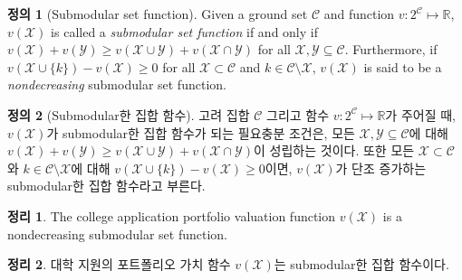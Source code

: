 \documentclass[11pt]{article} %
\newtheorem{theorem}{Theorem}
\theoremstyle{definition}
\newtheorem{definition}{Definition}
\newtheorem{theorem}{정리}
\theoremstyle{definition}
\newtheorem{definition}{정의}
\begin{document}
\ifen
\begin{definition}[Submodular set function]
Given a ground set $\mathcal{C}$ and function $v : 2^{\mathcal{C}} \mapsto \mathbb{R}$, $v(\mathcal{X})$ is called a \emph{submodular set function} if and only if $v(\mathcal{X}) + v(\mathcal{Y}) \geq v(\mathcal{X}\cup\mathcal{Y}) + v(\mathcal{X}\cap\mathcal{Y})$
for all $\mathcal{X}, \mathcal{Y} \subseteq \mathcal{C}$. Furthermore, if $ v(\mathcal{X}\cup\{k\}) - v(\mathcal{X}) \geq 0$ for all $\mathcal{X} \subset \mathcal{C}$ and $k \in \mathcal{C} \setminus \mathcal{X}$, $v(\mathcal{X})$ is said to be a \emph{nondecreasing} submodular set function.
\end{definition}
\else
\begin{definition}[Submodular한 집합 함수]
고려 집합 $\mathcal{C}$ 그리고 함수 $v : 2^{\mathcal{C}} \mapsto \mathbb{R}$가 주어질 때, $v(\mathcal{X})$가 submodular한 집합 함수가 되는 필요충분 조건은, 모든 $\mathcal{X}, \mathcal{Y} \subseteq \mathcal{C}$에 대해 $v(\mathcal{X}) + v(\mathcal{Y}) \geq v(\mathcal{X}\cup\mathcal{Y}) + v(\mathcal{X}\cap\mathcal{Y})$이 성립하는 것이다. 또한 모든 $\mathcal{X} \subset \mathcal{C}$와 $k \in \mathcal{C} \setminus \mathcal{X}$에 대해 $v(\mathcal{X}\cup\{k\}) - v(\mathcal{X}) \geq 0$이면, $v(\mathcal{X})$가 단조 증가하는 submodular한 집합 함수라고 부른다.
\end{definition}
\fi

\ifen
\begin{theorem}
The college application portfolio valuation function
$v(\mathcal{X})$ %
is a nondecreasing submodular set function.
\end{theorem}
\else
\begin{theorem}
대학 지원의 포트폴리오 가치 함수 $v(\mathcal{X})$는 submodular한 집합 함수이다.
\end{theorem}
\fi
\end{document}

